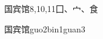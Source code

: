 \begin{entry}{国宾馆}{8,10,11}{⼞、⼧、⾷}
  \begin{phonetics}{国宾馆}{guo2bin1guan3}
  \end{phonetics}
\end{entry}

